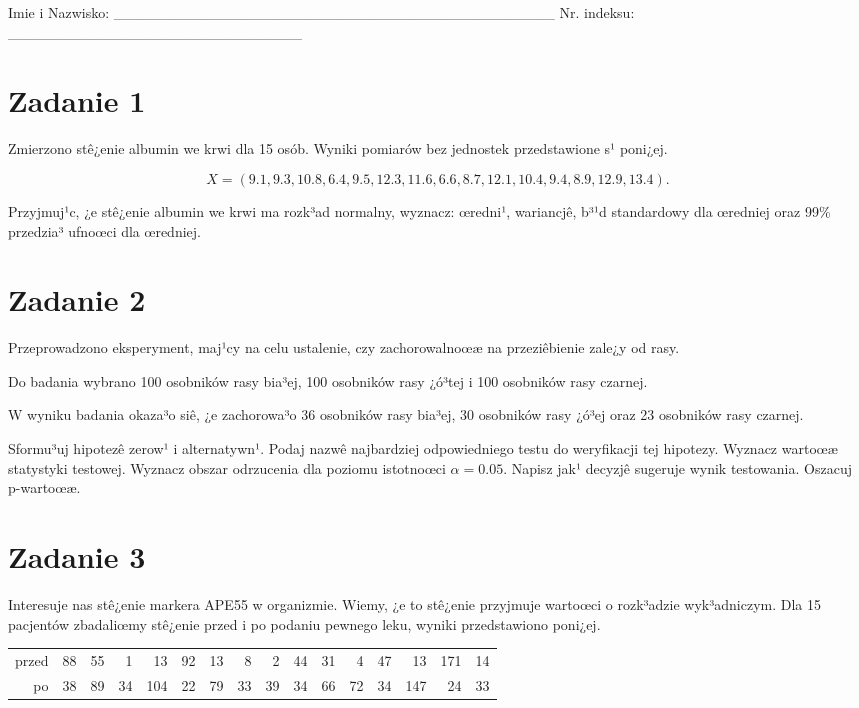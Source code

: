 \documentclass[a4paper,12pt]{article}
\begin{document}
 Imie i Nazwisko: \_\_\_\_\_\_\_\_\_\_\_\_\_\_\_\_\_\_\_\_\_\_\_\_\_\_\_\_\_\_\_\_\_\_\_\_\_\_\_\_\_\_ Nr. indeksu: \_\_\_\_\_\_\_\_\_\_\_\_\_\_\_\_\_\_\_\_\_\_\_\_\_\_\_\_ 
 \section*{Zadanie 1}
     
     Zmierzono stê¿enie albumin we krwi dla 15 osób. 
     Wyniki pomiarów bez jednostek przedstawione s¹ poni¿ej. 
     
     \noindent $$X=(  9.1,  9.3, 10.8,  6.4,  9.5, 12.3, 11.6,  6.6,  8.7, 12.1, 10.4,  9.4,  8.9, 12.9, 13.4 ).$$
     
     Przyjmuj¹c, ¿e stê¿enie albumin we krwi ma rozk³ad normalny, 
     wyznacz: œredni¹, wariancjê, b³¹d standardowy dla œredniej oraz 99\% przedzia³ ufnoœci dla œredniej. \vspace{1cm} 

  \section*{Zadanie 2}
     
  Przeprowadzono eksperyment, maj¹cy na celu ustalenie, czy zachorowalnoœæ na przeziêbienie zale¿y od rasy.
  
  Do badania wybrano 100 osobników rasy bia³ej, 100 osobników rasy ¿ó³tej i 100 osobników rasy czarnej. 
  
  W wyniku badania okaza³o siê, ¿e zachorowa³o 36 osobników rasy bia³ej, 30 osobników rasy ¿ó³ej oraz 23 osobników rasy czarnej. 
  
  Sformu³uj hipotezê zerow¹ i alternatywn¹. 
  Podaj nazwê najbardziej odpowiedniego testu do weryfikacji tej hipotezy. 
  Wyznacz wartoœæ statystyki testowej. 
  Wyznacz obszar odrzucenia dla poziomu istotnoœci $\alpha=0.05$. 
  Napisz jak¹ decyzjê sugeruje wynik testowania. Oszacuj p-wartoœæ. \vspace{1cm} 

  \section*{Zadanie 3}
     
  Interesuje nas stê¿enie markera APE55  w organizmie. 
  Wiemy, ¿e to stê¿enie przyjmuje wartoœci o rozk³adzie wyk³adniczym. 
  Dla 15 pacjentów zbadaliœmy stê¿enie przed i po podaniu pewnego leku, 
  wyniki przedstawiono poni¿ej.
  
  \vspace{0.5cm} 
  \noindent\begin{center} 
\begin{tabular}{rrrrrrrrrrrrrrrr}
  \hline
  \hline
przed & 88 & 55 & 1 & 13 & 92 & 13 & 8 & 2 & 44 & 31 & 4 & 47 & 13 & 171 & 14 \\
  po & 38 & 89 & 34 & 104 & 22 & 79 & 33 & 39 & 34 & 66 & 72 & 34 & 147 & 24 & 33 \\
   \hline
\end{tabular}
 
  \end{center} 
  \vspace{0.5cm}
  
\end{document}
